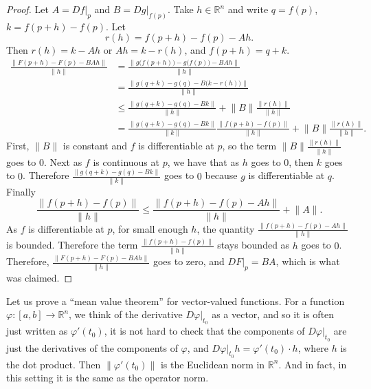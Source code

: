 \documentclass[12pt,openany]{book}
\newcommand{\snorm}[1]{\lVert {#1} \rVert}
\newcommand{\R}{{\mathbb{R}}}
\theoremstyle{plain}
\theoremstyle{remark}
\theoremstyle{definition}
\theoremstyle{exercise}
\theoremstyle{example}
\begin{document}
\begin{proof}
Let $A = Df|_p$ and $B = Dg|_{f(p)}$.  Take $h \in \R^n$
and write $q = f(p)$, $k = f(p+h)-f(p)$.  Let
\begin{equation*}
r(h) = f(p+h)-f(p) - A h . %
\end{equation*}
Then $r(h) = k-Ah$ or $Ah = k-r(h)$, and $f(p+h) = q+k$.
\begin{equation*}
\begin{split}
\frac{\snorm{F(p+h)-F(p) - BAh}}{\snorm{h}}
& =
\frac{\snorm{g\bigl(f(p+h)\bigr)-g\bigl(f(p)\bigr) - BAh}}{\snorm{h}}
\\
& =
\frac{\snorm{g(q+k)-g(q) - B\bigl(k-r(h)\bigr)}}{\snorm{h}}
\\
& \leq
\frac
{\snorm{g(q+k)-g(q) - Bk}}
{\snorm{h}}
+
\snorm{B}
\frac
{\snorm{r(h)}}
{\snorm{h}}
\\
& =
\frac
{\snorm{g(q+k)-g(q) - Bk}}
{\snorm{k}}
\frac
{\snorm{f(p+h)-f(p)}}
{\snorm{h}}
+
\snorm{B}
\frac
{\snorm{r(h)}}
{\snorm{h}} .
\end{split}
\end{equation*}
First, $\snorm{B}$ is constant and $f$ is differentiable at $p$,
so
the term $\snorm{B}\frac{\snorm{r(h)}}{\snorm{h}}$ goes to $0$.
Next as $f$ is continuous at $p$, we have that as 
$h$ goes to $0$, then $k$ goes to $0$.  Therefore
$\frac
{\snorm{g(q+k)-g(q) - Bk}}
{\snorm{k}}$ goes to $0$ because $g$ is differentiable at $q$.
Finally 
\begin{equation*}
\frac
{\snorm{f(p+h)-f(p)}}
{\snorm{h}}
\leq
\frac
{\snorm{f(p+h)-f(p)-Ah}}
{\snorm{h}}
+
\snorm{A} .
\end{equation*}
As $f$ is differentiable at $p$,
for small enough $h$, the quantity
$\frac{\snorm{f(p+h)-f(p)-Ah}}{\snorm{h}}$ is bounded.  Therefore the
term
$
\frac
{\snorm{f(p+h)-f(p)}}
{\snorm{h}}
$
stays bounded as $h$ goes to $0$.  Therefore, 
$\frac{\snorm{F(p+h)-F(p) - BAh}}{\snorm{h}}$ goes to zero, and
$DF|_p = BA$, which is what was claimed.
\end{proof}

Let us prove a ``mean value theorem'' for vector-valued functions.
For a function $\varphi \colon [a,b] \to \R^n$, we think of the derivative
$D\varphi|_{t_0}$ as a vector, and so 
it is often just written as $\varphi'(t_0)$, it is not hard to check that
the components of $D\varphi|_{t_0}$ are just the derivatives of the
components of $\varphi$, and $D\varphi|_{t_0} h = \varphi'(t_0) \cdot h$,
where $h$ is the dot product.  Then
$\snorm{\varphi'(t_0)}$
is the Euclidean norm in $\R^n$.  And in fact, in this setting it is the same
as the operator norm.
\end{document}
